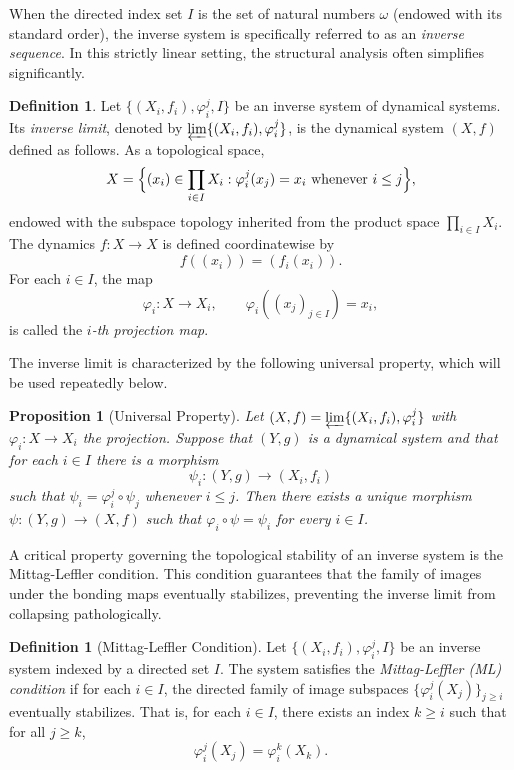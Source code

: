 \documentclass[12pt]{amsart}
\newtheorem{proposition}[theorem]{Proposition}
\theoremstyle{definition}
\newtheorem{definition}[theorem]{Definition}
\numberwithin{equation}{section}
\theoremstyle{remark}
\begin{document}
When the directed index set $I$ is the set of natural numbers $\omega$ (endowed with its standard order), the inverse system is specifically referred to as an \emph{inverse sequence}. In this strictly linear setting, the structural analysis often simplifies significantly.

\begin{definition}
Let $\{(X_i,f_i),\varphi_i^j, I\}$ be an inverse system of dynamical systems.
Its \emph{inverse limit}, denoted by
$\varprojlim \{(X_i,f_i),\varphi_i^j\}$, is the dynamical system $(X,f)$
defined as follows. As a topological space,
\[
X=
\Bigl\{
(x_i)\in \prod_{i\in I}X_i :
\varphi_i^j(x_j)=x_i
\text{ whenever } i\le j
\Bigr\},
\]
endowed with the subspace topology inherited from the product space
$\prod_{i\in I}X_i$. The dynamics $f:X\to X$ is defined coordinatewise by
\[
    f((x_i))=(f_i(x_i)).
\]
For each $i\in I$, the map
\[
    \varphi_i:X\to X_i,\qquad \varphi_i((x_j)_{j\in I})=x_i,
\]
is called the \emph{$i$-th projection map}.
\end{definition}

The inverse limit is characterized by the following universal property, which
will be used repeatedly below.

\begin{proposition}[Universal Property]\label{prop:universal}
Let $(X,f)=\varprojlim \{(X_i,f_i),\varphi_i^j\}$ with $\varphi_i: X\to X_i$ the projection. Suppose that $(Y,g)$ is a dynamical system and that for each $i\in I$ there is a morphism
\[
\psi_i:(Y,g)\to (X_i,f_i)
\]
such that $\psi_i = \varphi_i^j\circ \psi_j$ whenever $i\le j$. Then there exists a unique morphism $\psi:(Y,g)\to (X,f)$ such that $\varphi_i\circ \psi=\psi_i$ for every $i\in I$.
\end{proposition}

A critical property governing the topological stability of an inverse system is the Mittag-Leffler condition. This condition guarantees that the family of images under the bonding maps eventually stabilizes, preventing the inverse limit from collapsing pathologically.

\begin{definition}[Mittag-Leffler Condition]
Let $\{(X_i,f_i),\varphi_i^j, I\}$ be an inverse system indexed by a directed set $I$. The system satisfies the \emph{Mittag-Leffler (ML) condition} if for each $i \in I$, the directed family of image subspaces $\{\varphi_i^j(X_j)\}_{j \ge i}$ eventually stabilizes. That is, for each $i \in I$, there exists an index $k \ge i$ such that for all $j \ge k$,
\[
\varphi_i^j(X_j) = \varphi_i^k(X_k).
\]
\end{definition}
\end{document}
